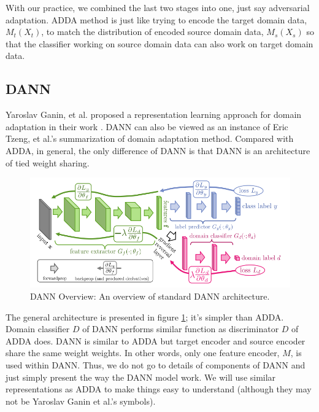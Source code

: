 \documentclass[conference]{IEEEtran}
\begin{document}
    With our practice, we combined the last two stages into one, just say adversarial adaptation. ADDA method is just like trying to encode the target domain data, $M_t(X_t)$, to match the distribution of encoded source domain data, $M_s(X_s)$ so that the classifier working on source domain data can also work on target domain data.




\subsection{DANN}
Yaroslav Ganin, et al. proposed a representation learning approach for domain adaptation in their work \cite{DANN1}. DANN can also be viewed as an instance of Eric Tzeng, et al.'s summarization of domain adaptation method. Compared with ADDA, in general, the only difference of DANN is that DANN is an architecture of tied weight sharing.
\begin{figure}
  \centering
  \includegraphics[width=.8\textwidth]{LDANN_theorem1.jpg}
  \caption{DANN Overview: An overview of standard DANN architecture.}
  \label{DANN_overview}
\end{figure}
The general architecture is presented in figure \ref{DANN_overview}; it's simpler than ADDA. Domain classifier $D$ of DANN performs similar function as discriminator $D$ of ADDA does. DANN is similar to ADDA but target encoder and source encoder share the same weight weights. In other words, only one feature encoder, $M$, is used within DANN. Thus, we do not go to details of components of DANN and just simply present the way the DANN model work. We will use similar representations as ADDA to make things easy to understand (although they may not be Yaroslav Ganin et al.'s symbols).
\end{document}
